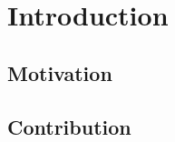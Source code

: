 \chapter{Introduction}
\label{cha:introduction}



\section{Motivation}
\label{sec:Motivation}





\section{Contribution}
\label{sec:contribution}


